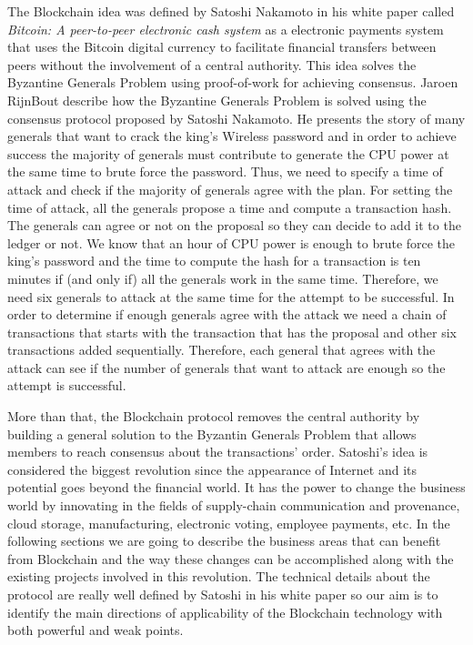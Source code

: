 The Blockchain idea was defined by Satoshi Nakamoto in his white paper called \emph{Bitcoin: A peer-to-peer electronic cash  system} \cite{bitcoinwhitepaper} as a electronic payments system that uses the Bitcoin digital currency to facilitate financial transfers between peers without the involvement of a central authority.
This idea solves the Byzantine Generals Problem using proof-of-work for achieving consensus. Jaroen RijnBout \cite{pow-byzantine} describe how the Byzantine Generals Problem is solved using the consensus protocol proposed by Satoshi Nakamoto. He presents the story of many generals that want to crack the king's Wireless password and in order to achieve success the majority of generals must contribute to generate the CPU power at the same time to brute force the password. Thus, we need to specify a time of attack and check if the majority of generals agree with the plan. For setting the time of attack, all the generals propose a time and compute a transaction hash. The generals can agree or not on the proposal so they can decide to add it to the ledger or not. We know that an hour of CPU power is enough to brute force the king's password and the time to compute the hash for a transaction is ten minutes if (and only if) all the generals work in the same time. Therefore, we need six generals to attack at the same time for the attempt to be successful. In order to determine if enough generals agree with the attack we need a chain of transactions that starts with the transaction that has the proposal and other six transactions added sequentially. Therefore, each general that agrees with the attack can see if the number of generals that want to attack are enough so the attempt is successful.

More than that, the Blockchain protocol removes the central authority by building a general solution to the Byzantin Generals Problem that allows members to reach consensus about the transactions' order.
Satoshi's idea is considered the biggest revolution since the appearance of Internet and its potential goes beyond the financial world. It has the power to change the business world by innovating in the fields of supply-chain communication and provenance, cloud storage, manufacturing, electronic voting, employee payments, etc.
In the following sections we are going to describe the business areas that can benefit from Blockchain and the way these changes can be accomplished along with the existing projects involved in this revolution.
The technical details about the protocol are really well defined by Satoshi in his white paper \cite{bitcoinwhitepaper} so our aim is to identify the main directions of applicability of the Blockchain technology with both powerful and weak points. 


